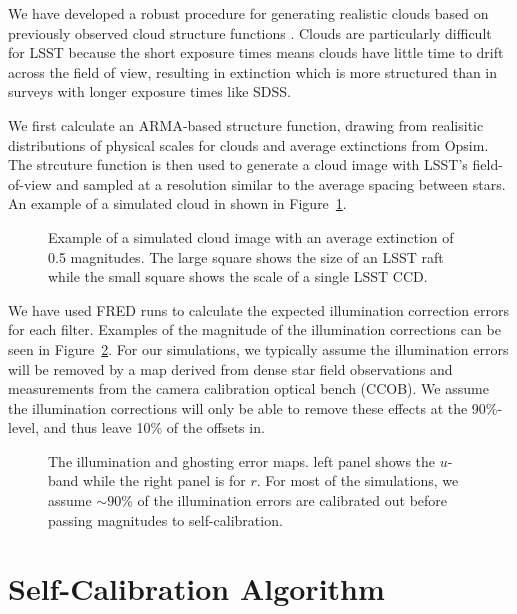 \documentclass[12pt,preprint]{aastex}
\begin{document}
We have developed a robust procedure for generating realistic clouds based on previously observed cloud structure functions \citep{Ivezic2007,Burke2010}. Clouds are particularly difficult for LSST because the short exposure times means clouds have little time to drift across the field of view, resulting in extinction which is more structured than in surveys with longer exposure times like SDSS.  

We first calculate an ARMA-based structure function, drawing from realisitic distributions of physical scales for clouds and average extinctions from Opsim.  The strcuture function is then used to generate a cloud image with LSST's field-of-view and sampled at a resolution similar to the average spacing between stars.  An example of a simulated cloud in shown in Figure~\ref{fig:cloud}.  


\begin{figure}
\caption{Example of a simulated cloud image with an average extinction of 0.5 magnitudes.  The large square shows the size of an LSST raft while the small square shows the scale of a single LSST CCD.  \label{fig:cloud}}
\end{figure}

We have used FRED runs to calculate the expected illumination correction errors for each filter.  Examples of the magnitude of the illumination corrections can be seen in Figure~\ref{fig:illum}.  For our simulations, we typically assume the illumination errors will be removed by a map derived from dense star field observations and measurements from the camera calibration optical bench (CCOB).  We assume the illumination corrections will only be able to remove these effects at the 90\%-level, and thus leave 10\% of the offsets in.  

\begin{figure}
\caption{The illumination and ghosting error maps.  left panel shows
the $u$-band while the right panel is for $r$. For most of the simulations, we assume $\sim90$\% of the illumination errors are calibrated out before passing magnitudes to self-calibration.  \label{fig:illum}}
\end{figure}


\section{Self-Calibration Algorithm}\label{alg}
\end{document}
